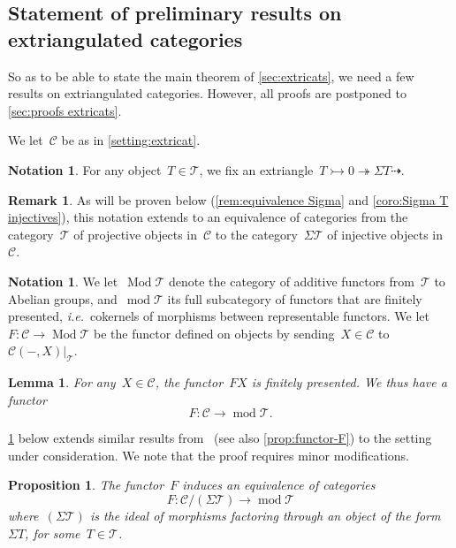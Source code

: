 \documentclass{amsart}
\newtheorem{proposition}[theorem]{Proposition}
\newtheorem{lemma}[theorem]{Lemma}
\theoremstyle{definition}
\newtheorem{remark}[theorem]{Remark}
\newtheorem{notation}[theorem]{Notation}
\newcommand{\ie}{\textit{i.e.}~} %
\newcommand{\cat}{\mathcal{C}}
\newcommand{\susp}{\Sigma}
\newcommand{\MOD}{\operatorname{mod}}
\newcommand{\tc}{\mathcal{T}}
\newcommand{\infl}{\rightarrowtail}
\newcommand{\defl}{\twoheadrightarrow}
\newcommand{\Modt}{\operatorname{Mod}\tc}
\newcommand{\modt}{\MOD\tc}
\begin{document}

\subsection{Statement of preliminary results on extriangulated categories}
\label{sec:prelim on extricats}

So as to be able to state the main theorem of \cref{sec:extricats}, we need a few results on extriangulated categories.
However, all proofs are postponed to \cref{sec:proofs extricats}.

We let~$\cat$ be as in \cref{setting:extricat}.

\begin{notation}
For any object~$T\in\tc$, we fix an extriangle~$T\infl 0 \defl \susp T \dashrightarrow$.
\end{notation}

\begin{remark}
As will be proven below (\cref{rem:equivalence Sigma} and \cref{coro:Sigma T injectives}), this notation extends to an equivalence of categories from the category~$\tc$ of projective objects in~$\cat$ to the category~$\susp\tc$ of injective objects in~$\cat$.
\end{remark}


\begin{notation}
We let~$\Modt$ denote the category of additive functors from~$\tc$ to Abelian groups, and~$\modt$ its full subcategory of functors that are finitely presented, \ie cokernels of morphisms between representable functors.
We let~$F:\cat\to\Modt$ be the functor defined on objects by sending~$X\in\cat$ to~$\cat(-,X)|_\tc$.
\end{notation}

\begin{lemma}
\label{lem:finitely presented}
For any~$X\in\cat$, the functor~$FX$ is finitely presented.
We thus have a functor
\[
F:\cat\to\modt.
\]
\end{lemma}

\cref{prop:KRextricat} below extends similar results from~\cite{BuanMarshReiten,KellerReiten,KoenigZhu,IyamaYoshino} (see also \cref{prop:functor-F}) to the setting under consideration. We note that the proof requires minor modifications.

\begin{proposition}
\label{prop:KRextricat}
The functor~$F$ induces an equivalence of categories
\[
F: \cat/(\susp\tc) \to \modt
\]
where~$(\susp\tc)$ is the ideal of morphisms factoring through an object of the form~$\susp T$, for some~$T\in\tc$.
\end{proposition}
\end{document}
